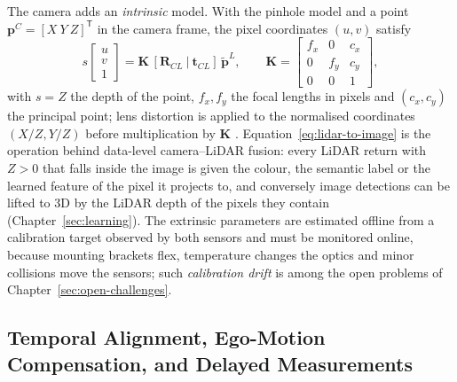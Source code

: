\documentclass[graybox,envcountchap]{style/SNmono}
\begin{document}
The camera adds an \emph{intrinsic} model. With the pinhole model and a point $\mathbf{p}^{C}=[X\ Y\ Z]^{\mathsf T}$ in the camera frame, the pixel coordinates $(u,v)$ satisfy
\begin{equation}
s\begin{bmatrix}u\\ v\\ 1\end{bmatrix}
=\mathbf{K}\,[\mathbf{R}_{C\!L}\ |\ \mathbf{t}_{C\!L}]\,\tilde{\mathbf{p}}^{L},
\qquad
\mathbf{K}=
\begin{bmatrix}
f_{x} & 0 & c_{x}\\
0 & f_{y} & c_{y}\\
0 & 0 & 1
\end{bmatrix},
\label{eq:lidar-to-image}
\end{equation}
with $s=Z$ the depth of the point, $f_{x},f_{y}$ the focal lengths in pixels and $(c_{x},c_{y})$ the principal point; lens distortion is applied to the normalised coordinates $(X/Z,Y/Z)$ before multiplication by $\mathbf{K}$ \cite{zhang2000_calibration}. Equation~\eqref{eq:lidar-to-image} is the operation behind data-level camera--LiDAR fusion: every LiDAR return with $Z>0$ that falls inside the image is given the colour, the semantic label or the learned feature of the pixel it projects to, and conversely image detections can be lifted to 3D by the LiDAR depth of the pixels they contain (Chapter~\ref{sec:learning}). The extrinsic parameters are estimated offline from a calibration target observed by both sensors \cite{geiger2012_calibration} and must be monitored online, because mounting brackets flex, temperature changes the optics and minor collisions move the sensors; such \emph{calibration drift} is among the open problems of Chapter~\ref{sec:open-challenges}.

\subsection{Temporal Alignment, Ego-Motion Compensation, and Delayed Measurements}
\label{subsec:temporal-alignment}
\end{document}

